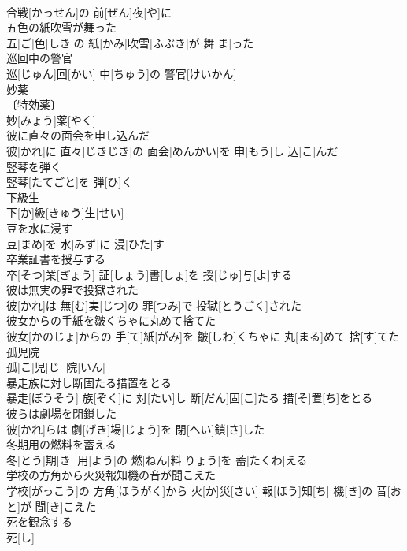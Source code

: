 \documentclass[8pt]{extreport}
\begin{document}
\begin{CJK}{UTF8}{min}
\\	合戦[かっせん]の 前[ぜん]夜[や]に
\\	五色の紙吹雪が舞った	
\\	五[ご]色[しき]の 紙[かみ]吹雪[ふぶき]が 舞[ま]った
\\	巡回中の警官	
\\	巡[じゅん]回[かい] 中[ちゅう]の 警官[けいかん]
\\	妙薬	
\\	〔特効薬〕
\\	妙[みょう]薬[やく]
\\	彼に直々の面会を申し込んだ	
\\	彼[かれ]に 直々[じきじき]の 面会[めんかい]を 申[もう]し 込[こ]んだ
\\	竪琴を弾く	
\\	竪琴[たてごと]を 弾[ひ]く
\\	下級生	
\\	下[か]級[きゅう]生[せい]
\\	豆を水に浸す	
\\	豆[まめ]を 水[みず]に 浸[ひた]す
\\	卒業証書を授与する	
\\	卒[そつ]業[ぎょう] 証[しょう]書[しょ]を 授[じゅ]与[よ]する
\\	彼は無実の罪で投獄された	
\\	彼[かれ]は 無[む]実[じつ]の 罪[つみ]で 投獄[とうごく]された
\\	彼女からの手紙を皺くちゃに丸めて捨てた	
\\	彼女[かのじょ]からの 手[て]紙[がみ]を 皺[しわ]くちゃに 丸[まる]めて 捨[す]てた
\\	孤児院	
\\	孤[こ]児[じ] 院[いん]
\\	暴走族に対し断固たる措置をとる	
\\	暴走[ぼうそう] 族[ぞく]に 対[たい]し 断[だん]固[こ]たる 措[そ]置[ち]をとる
\\	彼らは劇場を閉鎖した	
\\	彼[かれ]らは 劇[げき]場[じょう]を 閉[へい]鎖[さ]した
\\	冬期用の燃料を蓄える	
\\	冬[とう]期[き] 用[よう]の 燃[ねん]料[りょう]を 蓄[たくわ]える
\\	学校の方角から火災報知機の音が聞こえた	
\\	学校[がっこう]の 方角[ほうがく]から 火[か]災[さい] 報[ほう]知[ち] 機[き]の 音[おと]が 聞[き]こえた
\\	死を観念する	
\\	死[し]

\end{CJK}
\end{document}

